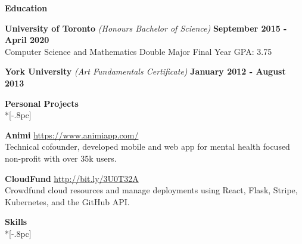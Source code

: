 \documentclass{article}
\begin{document}


\vspace{4pt}
{\large \bf Education} \\[-.8pc]
\underline{\hspace{7in}} 

{\bf University of Toronto} {\textit{(Honours Bachelor of Science)}} \hfill {\bf September 2015 - April 2020} \\[.2pc]
Computer Science and Mathematics Double Major  \hfill {Final Year GPA: 3.75}

{\bf York University} {\textit{(Art Fundamentals Certificate)}} \hfill {\bf January 2012 - August 2013 \/} 

\vspace{4pt}
{\large \bf Personal Projects} \\*[-.8pc]
\underline{\hspace{7in}}


\textbf{Animi} \hfill \url{https://www.animiapp.com/}\\
Technical cofounder, developed mobile and web app for mental health focused non-profit with over 35k users.

\textbf{CloudFund} \hfill \url{http://bit.ly/3U0T32A}\\
Crowdfund cloud resources and manage deployments using React, Flask, Stripe, Kubernetes, and the GitHub API.


\vspace{4pt}
{\large \bf Skills} \\*[-.8pc]
\underline{\hspace{7in}}
\end{document}
